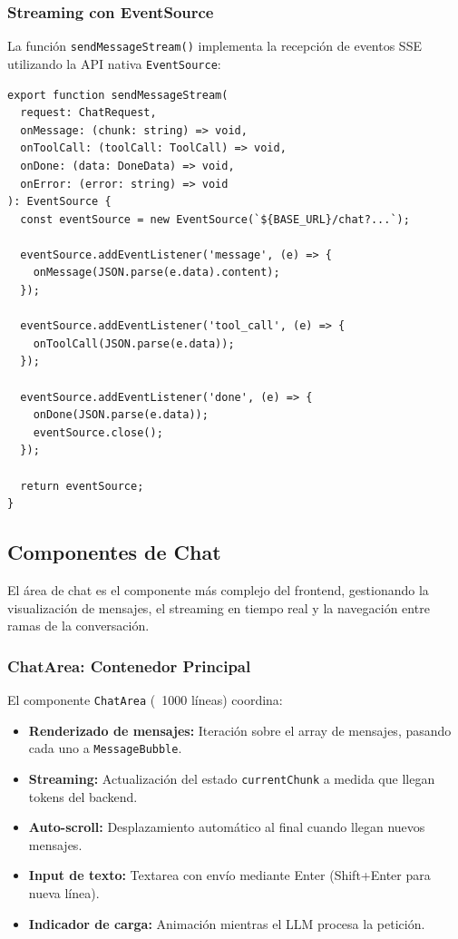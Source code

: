 \subsubsection{Streaming con EventSource}

La función \texttt{sendMessageStream()} implementa la recepción de eventos SSE utilizando la API nativa \texttt{EventSource}:

\begin{verbatim}
export function sendMessageStream(
  request: ChatRequest,
  onMessage: (chunk: string) => void,
  onToolCall: (toolCall: ToolCall) => void,
  onDone: (data: DoneData) => void,
  onError: (error: string) => void
): EventSource {
  const eventSource = new EventSource(`${BASE_URL}/chat?...`);
  
  eventSource.addEventListener('message', (e) => {
    onMessage(JSON.parse(e.data).content);
  });
  
  eventSource.addEventListener('tool_call', (e) => {
    onToolCall(JSON.parse(e.data));
  });
  
  eventSource.addEventListener('done', (e) => {
    onDone(JSON.parse(e.data));
    eventSource.close();
  });
  
  return eventSource;
}
\end{verbatim}

\subsection{Componentes de Chat}

El área de chat es el componente más complejo del frontend, gestionando la visualización de mensajes, el streaming en tiempo real y la navegación entre ramas de la conversación.

\subsubsection{ChatArea: Contenedor Principal}

El componente \texttt{ChatArea} (~1000 líneas) coordina:

\begin{itemize}
    \item \textbf{Renderizado de mensajes:} Iteración sobre el array de mensajes, pasando cada uno a \texttt{MessageBubble}.
    \item \textbf{Streaming:} Actualización del estado \texttt{currentChunk} a medida que llegan tokens del backend.
    \item \textbf{Auto-scroll:} Desplazamiento automático al final cuando llegan nuevos mensajes.
    \item \textbf{Input de texto:} Textarea con envío mediante Enter (Shift+Enter para nueva línea).
    \item \textbf{Indicador de carga:} Animación mientras el LLM procesa la petición.
\end{itemize}

